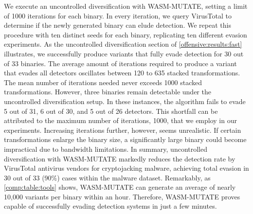 We execute an uncontrolled diversification with WASM-MUTATE, setting a limit of 1000 iterations for each binary. 
In every iteration, we query VirusTotal to determine if the newly generated binary can elude detection. 
We repeat this procedure with ten distinct seeds for each binary, replicating ten different evasion experiments. 
As the uncontrolled diversification section of \autoref{offensive:results:fast} illustrates, we successfully produce variants that fully evade detection for 30 out of 33 binaries. 
The average amount of iterations required to produce a variant that evades all detectors oscillates between 120 to 635 stacked transformations. 
The mean number of iterations needed never exceeds 1000 stacked transformations. 
However, three binaries remain detectable under the uncontrolled diversification setup. 
In these instances, the algorithm fails to evade 5 out of 31, 6 out of 30, and 5 out of 26 detectors. 
This shortfall can be attributed to the maximum number of iterations, 1000, that we employ in our experiments. 
Increasing iterations further, however, seems unrealistic. 
If certain transformations enlarge the binary size, a significantly large binary could become impractical due to bandwidth limitations. 
In summary, uncontrolled diversification with WASM-MUTATE markedly reduces the detection rate by VirusTotal antivirus vendors for cryptojacking malware, achieving total evasion in 30 out of 33 (90\%) cases within the malware dataset. 
Remarkably, as \autoref{comp:table:tools} shows, WASM-MUTATE can generate an average of nearly 10,000 variants per binary within an hour. 
Therefore, WASM-MUTATE proves capable of successfully evading detection systems in just a few minutes.


